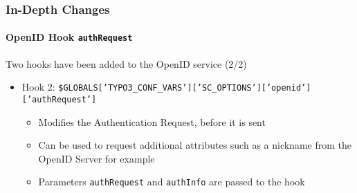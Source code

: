 \begin{frame}[fragile]
	\frametitle{In-Depth Changes}
	\framesubtitle{OpenID Hook \texttt{authRequest}}

	\lstset{basicstyle=\tiny\ttfamily}

	Two hooks have been added to the OpenID service (2/2)

		\begin{itemize}

			\item Hook 2:\newline
				\smaller\smaller
					\texttt{\$GLOBALS['TYPO3\_CONF\_VARS']['SC\_OPTIONS']['openid']['authRequest']}
				\normalsize

				\begin{itemize}
					\item Modifies the Authentication Request, before it is sent
					\item Can be used to request additional attributes such as a nickname from the OpenID Server for example
					\item Parameters \texttt{authRequest} and \texttt{authInfo} are passed to the hook
				\end{itemize}

		\end{itemize}

\end{frame}

